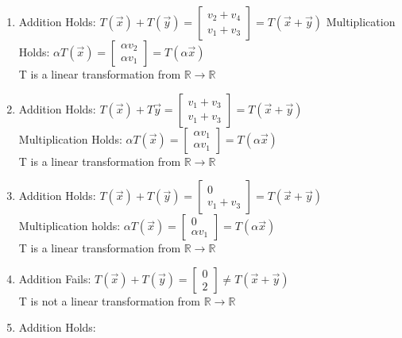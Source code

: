 \begin{enumerate}[label=(\alph*)]
\item Addition Holds: $T(\Vec{x})+T(\Vec{y}) = 
\begin{bmatrix}
v_2+v_4 \\
v_1+v_3
\end{bmatrix} = T(\Vec{x} + \Vec{y})$ 
\newline
Multiplication Holds: $\alpha T(\Vec{x}) = \begin{bmatrix} \alpha v_2 \\ \alpha v_1 \end{bmatrix} = T(\alpha \Vec{x})$ 
\\ T is a linear transformation from $\mathbb{R} \to \mathbb{R}$

\item Addition Holds: 
    $T(\Vec{x}) + T\Vec{y} = \begin{bmatrix} v_1+v_3 \\ v_1+v_3\end{bmatrix} = T(\Vec{x} + \Vec{y})$
    \\
    Multiplication Holds:
    $\alpha T(\Vec{x}) = \begin{bmatrix}
    \alpha v_1 \\
    \alpha v_1
    \end{bmatrix} = T (\alpha \Vec{x})$
    \\ T is a linear transformation from $\mathbb{R} \to \mathbb{R}$
\item Addition Holds:
    $T(\Vec{x})+ T(\Vec{y}) = \begin{bmatrix}
    0 \\ v_1 + v_3
    \end{bmatrix} = T(\Vec{x} + \Vec{y})$
    \\
    Multiplication holds: 
    $\alpha T(\Vec{x}) = \begin{bmatrix}
    0 \\
    \alpha v_1
    \end{bmatrix} = T (\alpha \Vec{x})$
    \\ T is a linear transformation from $\mathbb{R} \to \mathbb{R}$
\item Addition Fails:
     $T(\Vec{x})+ T(\Vec{y}) = \begin{bmatrix}
     0 \\ 2
    \end{bmatrix} \ne T(\Vec{x} + \Vec{y})$
    \\ T is not a linear transformation from $\mathbb{R} \to \mathbb{R}$
\item Addition Holds:

\end{enumerate}
